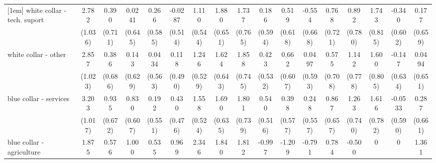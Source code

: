{\begin{tabular}{l*{16}{c}}
[1em]
white collar - tech. suport&       2.782\sym{**} &       0.390         &      0.0241         &       0.266         &     -0.0287         &       1.110\sym{*}  &       1.880\sym{**} &       1.737\sym{*}  &       0.186         &       0.519         &      -0.554         &       0.768         &       0.892         &       1.743\sym{*}  &      -0.340         &       0.177         \\
                    &     (1.036)         &     (0.711)         &     (0.645)         &     (0.585)         &     (0.514)         &     (0.544)         &     (0.651)         &     (0.765)         &     (0.594)         &     (0.618)         &     (0.668)         &     (0.721)         &     (0.780)         &     (0.815)         &     (0.602)         &     (0.659)         \\
[1em]
white collar - other&       2.857\sym{**} &       0.386         &       0.143         &      0.0434         &       0.118         &       1.246\sym{*}  &       1.624\sym{*}  &       1.858\sym{*}  &       0.423         &       0.662         &      0.0497         &       0.575         &       1.142         &       1.600\sym{*}  &      -0.147         &      0.0494         \\
                    &     (1.023)         &     (0.686)         &     (0.629)         &     (0.563)         &     (0.490)         &     (0.529)         &     (0.643)         &     (0.745)         &     (0.532)         &     (0.607)         &     (0.593)         &     (0.708)         &     (0.778)         &     (0.805)         &     (0.634)         &     (0.651)         \\
[1em]
blue collar - services&       3.203\sym{**} &       0.935         &       0.830         &       0.192         &       0.430         &       1.558\sym{**} &       1.690\sym{**} &       1.801\sym{*}  &       0.540         &       0.398         &       0.248         &       0.867         &       1.263         &       1.616\sym{*}  &     -0.0533         &       0.287         \\
                    &     (1.017)         &     (0.672)         &     (0.607)         &     (0.551)         &     (0.476)         &     (0.524)         &     (0.635)         &     (0.739)         &     (0.516)         &     (0.577)         &     (0.557)         &     (0.657)         &     (0.740)         &     (0.782)         &     (0.590)         &     (0.661)         \\
[1em]
blue collar - agriculture&       1.875         &       0.576         &       1.000         &       0.535         &       0.969         &       2.346\sym{***}&       1.840\sym{*}  &       1.812         &      -0.997         &      -1.209         &      -0.791         &       0.784         &      -0.500         &           0         &           0         &       1.361         \\

\end{tabular}}
